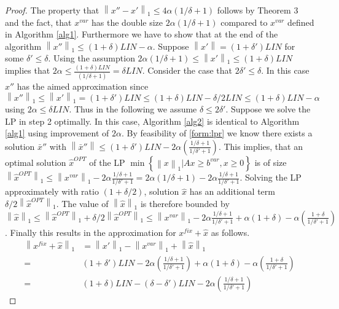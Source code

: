 \documentclass[a4paper,11pt]{article}
\newcommand{\mengest}[2]{\left\{#1|#2\right\}}
\newcommand{\nor}[1]{\left\|#1\right\|}
\begin{document}
\begin{proof}
	The property that $\nor{x''-x'}_1 \leq 4 \alpha (1/ \delta +1)$ follows by Theorem 3 and the fact,
	that $x^{var}$ has the double size $2 \alpha(1/ \delta +1)$ compared to $x^{var}$ defined in Algorithm \ref{alg1}. 
	Furthermore we have to show that at the end of the algorithm $\nor{x''}_1 \leq (1+ \delta) \mathit{LIN} - \alpha$.
	Suppose $\nor{x'} = (1+ \delta') \mathit{LIN}$ for some $\delta' \leq \delta$. Using the assumption 
	$2 \alpha(1/ \delta +1) \leq \nor{x'}_1 \leq (1+ \delta)\mathit{LIN}$ implies that
	$2 \alpha \leq \frac{(1+ \delta)\mathit{LIN}}{(1/\delta +1)} = \delta \mathit{LIN}$.
	Consider the case that $2 \delta' \leq \delta$. In this case $x''$ has the aimed approximation since 
	$\nor{x''}_1 \leq \nor{x'}_1 = (1+ \delta') 
	\mathit{LIN} \leq (1+ \delta) \mathit{LIN} - \delta/2 \mathit{LIN} \leq (1+ \delta) \mathit{LIN} - \alpha$ using
	$2\alpha \leq \delta \mathit{LIN}$.
	Thus in the following we assume $\delta \leq 2 \delta'$.
	Suppose we solve the LP in step 2 optimally. In this case, Algorithm \ref{alg2} is identical to Algorithm \ref{alg1} using improvement
	of $2 \alpha$. By feasibility of \ref{form:lpr} we know there exists a solution $\bar{x}''$
	with 
	$\nor{\bar{x}''} \leq (1+ \delta') \mathit{LIN} - 2\alpha(\frac{1/ \delta +1}{1/ \delta'+1})$.
	This implies, that an optimal solution $\hat{x}^{\mathit{OPT}}$ of the LP 
	$\min \mengest{\nor{x}_1}{Ax \geq b^{var}, x \geq 0 }$ is of size $\nor{\hat{x}^{\mathit{OPT}}}_1
	\leq \nor{x^{var}}_1 - 2\alpha \frac{1/\delta+1}{1/\delta'+1} = 2 \alpha(1/ \delta +1) -
	2\alpha \frac{1/\delta+1}{1/\delta'+1}$. Solving the LP approximately with ratio $(1+\delta / 2)$, 
	solution $\hat{x}$ has an additional term $\delta / 2 \nor{\hat{x}^{\mathit{OPT}}}_1$. The value of 
	$\nor{\hat{x}}_1$ is therefore bounded by
	$\nor{\hat{x}}_1 \leq \nor{\hat{x}^{\mathit{OPT}}}_1 + \delta / 2 \nor{\hat{x}^{\mathit{OPT}}}_1 
	\leq \nor{x^{var}}_1 - 2\alpha \frac{1/\delta+1}{1/\delta'+1} + 
	\alpha(1+ \delta) - \alpha (\frac{1+ \delta}{1/ \delta'+1})$.
	Finally this results in the approximation for $x^{fix} + \hat{x}$ as follows.
\begin{align*}
		\nor{x^{fix} + \hat{x}}_1 & = \nor{x'}_1 - \nor{x^{var}}_1 + \nor{\hat{x}}_1\\
       = &(1+ \delta') \mathit{LIN} -2 \alpha (\frac{1/ \delta +1}{1/ \delta'+1}) + \alpha(1+ \delta) 
       - \alpha (\frac{1+ \delta}{1/ \delta'+1}) \\
       = &(1+ \delta) \mathit{LIN} - (\delta - \delta') \mathit{LIN} -2 \alpha (\frac{1/ \delta +1}{1/ \delta'+1})

\end{align*}
\end{proof}
\end{document}

